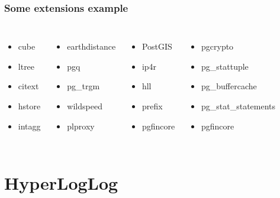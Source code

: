 \documentclass{beamer}
\begin{document}
\begin{frame}[fragile]
  \frametitle{Some extensions example}

  \vfill

\begin{columns}[c]

  \begin{itemize}
   \item cube
   \item \alert{ltree}
   \item citext
   \item \alert{hstore}
   \item \alert{intagg}
  \end{itemize}

  \begin{itemize}
   \item \alert{earthdistance}
   \item pgq
   \item \alert{pg\_trgm}
   \item wildspeed
   \item \alert{plproxy}
  \end{itemize}

  \begin{itemize}
   \item PostGIS
   \item \alert{ip4r}
   \item \alert{hll}
   \item \alert{prefix}
   \item pgfincore
  \end{itemize}

  \begin{itemize}
   \item pgcrypto
   \item pg\_stattuple
   \item pg\_buffercache
   \item pg\_stat\_statements
   \item \alert{pgfincore}
  \end{itemize}

\end{columns}
\end{frame}

\section{HyperLogLog}
\end{document}
